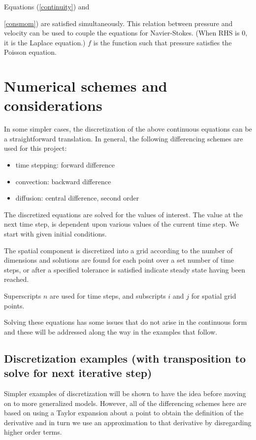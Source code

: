 \documentclass[11pt]{article}
\begin{document}
Equations (\ref{continuity}) and {\ref{consmom}) are satisfied simultaneously.
This relation between pressure and velocity can be used to couple the equations
for Navier-Stokes. (When RHS is 0, it is the Laplace equation.) $f$ is the
function such that pressure satisfies the Poisson equation.


\section{Numerical schemes and considerations}

In some simpler cases, the discretization of the above continuous equations can
be a straightforward translation. In general, the following differencing schemes are used
for this project:

\begin{itemize}
\item time stepping: forward difference
\item convection: backward difference
\item diffusion: central difference, second order
\end{itemize}

The discretized equations are solved for the values of interest.
The value at the next time step, is dependent upon various values of the current
time step. We start with given initial conditions.

The spatial component is discretized into a grid according to the number of
dimensions and solutions are found for each point over a set number of time
steps, or after a specified tolerance is satisfied indicate steady state having
been reached.

Superscripts $n$ are used for time steps,
and subscripts $i$ and $j$ for spatial grid points.

Solving these equations has some issues that do not arise in the continuous form
and these will be addressed along the way in the examples that follow.

\subsection{Discretization examples (with transposition to solve for next iterative step)}
Simpler examples of discretization will be shown to have the idea before moving
on to more generalized models. However, all of the differencing schemes here are
based on using a Taylor expansion about a point to obtain the definition of the
derivative and in turn we use an approximation to that derivative by disregarding
higher order terms.

}
\end{document}
